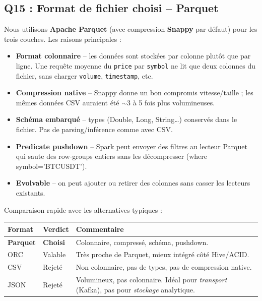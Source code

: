 \documentclass{RapportINPTCLOUD}
\begin{document}
\subsection{Q15 : Format de fichier choisi -- Parquet}

Nous utilisons \textbf{Apache Parquet} (avec compression \textbf{Snappy} par d\'{e}faut) pour les trois couches. Les raisons principales :

\begin{itemize}[leftmargin=2em]
    \item \textbf{Format colonnaire} -- les donn\'{e}es sont stock\'{e}es par colonne plut\^{o}t que par ligne. Une requ\^{e}te \og moyenne du \texttt{price} par \texttt{symbol}\fg{} ne lit que deux colonnes du fichier, sans charger \texttt{volume}, \texttt{timestamp}, etc.
    \item \textbf{Compression native} -- Snappy donne un bon compromis vitesse/taille ; les m\^{e}mes donn\'{e}es CSV auraient \'{e}t\'{e} $\sim$3 \`{a} 5 fois plus volumineuses.
    \item \textbf{Sch\'{e}ma embarqu\'{e}} -- types (Double, Long, String\dots) conserv\'{e}s dans le fichier. Pas de parsing/inf\'{e}rence comme avec CSV.
    \item \textbf{Predicate pushdown} -- Spark peut envoyer des filtres au lecteur Parquet qui saute des row-groups entiers sans les d\'{e}compresser (\og where symbol='BTCUSDT'\fg{}).
    \item \textbf{Evolvable} -- on peut ajouter ou retirer des colonnes sans casser les lecteurs existants.
\end{itemize}

Comparaison rapide avec les alternatives typiques :
\begin{center}
\begin{tabular}{|l|l|p{7cm}|}
\hline
\textbf{Format} & \textbf{Verdict} & \textbf{Commentaire} \\
\hline
\textbf{Parquet} & \textbf{Choisi} & Colonnaire, compress\'{e}, sch\'{e}ma, pushdown. \\
ORC & Valable & Tr\`{e}s proche de Parquet, mieux int\'{e}gr\'{e} c\^{o}t\'{e} Hive/ACID. \\
CSV & Rejet\'{e} & Non colonnaire, pas de types, pas de compression native. \\
JSON & Rejet\'{e} & Volumineux, pas colonnaire. Id\'{e}al pour \textit{transport} (Kafka), pas pour \textit{stockage} analytique. \\
\hline
\end{tabular}
\end{center}
\end{document}
